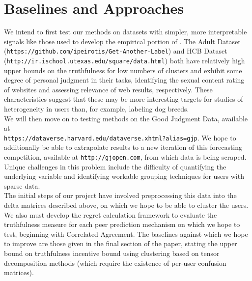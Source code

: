 \documentclass[a4paper, 12pt]{article}
\begin{document}
\section{Baselines and Approaches}
We intend to first test our methods on datasets with simpler, more interpretable signals like those used to develop the empirical portion of \citet{agarwal2017peer}. The Adult Dataset (\texttt{https://github.com/ipeirotis/Get-Another-Label}) and HCB Dataset \\ (\texttt{http://ir.ischool.utexas.edu/square/data.html}) both have relatively high upper bounds on the truthfulness for low numbers of clusters and exhibit some degree of personal judgment in their tasks, identifying the sexual content rating of websites and assessing relevance of web results, respectively. These characteristics suggest that these may be more interesting targets for studies of heterogeneity in users than, for example, labeling dog breeds. \\

We will then move on to testing methods on the Good Judgment Data, available at \\
\texttt{https://dataverse.harvard.edu/dataverse.xhtml?alias=gjp}. We hope to additionally be able to extrapolate results to a new iteration of this forecasting competition, available at \texttt{http://gjopen.com}, from which data is being scraped. Unique challenges in this problem include the difficulty of quantifying the underlying variable and identifying workable grouping techniques for users with sparse data. \\

The initial steps of our project have involved preprocessing this data into the delta matrices described above, on which we hope to be able to cluster the users. We also must develop the regret calculation framework to evaluate the truthfulness measure for each peer prediction mechanism on which we hope to test, beginning with Correlated Agreement. The baselines against which we hope to improve are those given in the final section of the paper, stating the upper bound on truthfulness incentive bound using clustering based on tensor decomposition methods (which require the existence of per-user confusion matrices). \\
\end{document}
